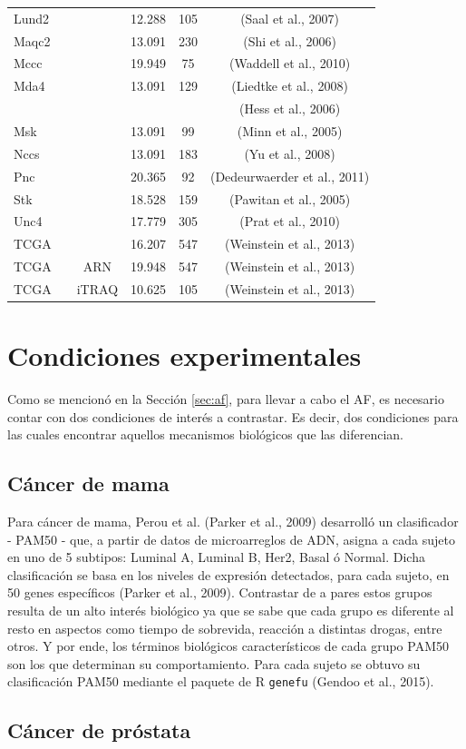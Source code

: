 \documentclass[12pt,twoside]{reedthesis}
\begin{document}
\begin{longtable}[]{@{}lccccc@{}}
Lund2 & & & 12.288 & 105 & (Saal et al., 2007)\tabularnewline
Maqc2 & & & 13.091 & 230 & (Shi et al., 2006)\tabularnewline
Mccc & & & 19.949 & 75 & (Waddell et al., 2010)\tabularnewline
Mda4 & & & 13.091 & 129 & (Liedtke et al., 2008)\tabularnewline
& & & & & (Hess et al., 2006)\tabularnewline
Msk & & & 13.091 & 99 & (Minn et al., 2005)\tabularnewline
Nccs & & & 13.091 & 183 & (Yu et al., 2008)\tabularnewline
Pnc & & & 20.365 & 92 & (Dedeurwaerder et al., 2011)\tabularnewline
Stk & & & 18.528 & 159 & (Pawitan et al., 2005)\tabularnewline
Unc4 & & & 17.779 & 305 & (Prat et al., 2010)\tabularnewline
TCGA & & & 16.207 & 547 & (Weinstein et al., 2013)\tabularnewline
TCGA & & ARN & 19.948 & 547 & (Weinstein et al., 2013)\tabularnewline
TCGA & & iTRAQ & 10.625 & 105 & (Weinstein et al., 2013)\tabularnewline
\bottomrule
\end{longtable}
\hypertarget{condiciones-experimentales}{%
\section{Condiciones experimentales}\label{condiciones-experimentales}}

Como se mencionó en la Sección \ref{sec:af}, para llevar a cabo el AF, es necesario contar con dos condiciones de interés a contrastar. Es decir, dos condiciones para las cuales encontrar aquellos mecanismos biológicos que las diferencian.

\hypertarget{sec:bcSubt}{%
\subsection{Cáncer de mama}\label{sec:bcSubt}}

Para cáncer de mama, Perou et al. (Parker et al., 2009) desarrolló un clasificador - PAM50 - que, a partir de datos de microarreglos de ADN, asigna a cada sujeto en uno de 5 subtipos: Luminal A, Luminal B, Her2, Basal ó Normal. Dicha clasificación se basa en los niveles de expresión detectados, para cada sujeto, en 50 genes específicos (Parker et al., 2009). Contrastar de a pares estos grupos resulta de un alto interés biológico ya que se sabe que cada grupo es diferente al resto en aspectos como tiempo de sobrevida, reacción a distintas drogas, entre otros. Y por ende, los términos biológicos característicos de cada grupo PAM50 son los que determinan su comportamiento. Para cada sujeto se obtuvo su clasificación PAM50 mediante el paquete de R \texttt{genefu} (Gendoo et al., 2015).

\hypertarget{cancer-de-prostata}{%
\subsection{Cáncer de próstata}\label{cancer-de-prostata}}
\end{document}
